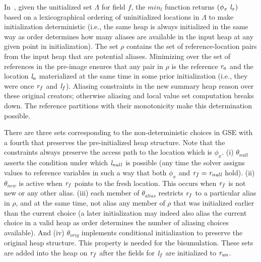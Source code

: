 
In~, given the unitialized set $\Lambda$ for
field $f$, the $\mathit{min}_l$ function returns
$(\phi_x\ \cfgnt{l}_x)$ based on a lexicographical ordering of
uninitialized locations in $\Lambda$ to make initialization
deterministic (i.e., the same heap is always initialized in the same
way as order determines how many aliases are available in the input heap at any given point in initialization). 
The set $\rho$ contains the set of
reference-location pairs from the input heap that are potential
aliases. Minimizing over the set of references in the pre-image ensures
that any pair in $\rho$ is the reference $\emph{r}_a$ and the location $\emph{l}_a$ materialized at the same time in some prior initialization (i.e., they were once
$\emph{r}_f$ and $\emph{l}_f$). Aliasing constraints
in the new summary heap reason over these original creators; otherwise aliasing and local value set
computation breaks down.  The reference partitions with their
monotonicity make this determination possible.

There are three sets corresponding to the non-deterministic choices in
GSE with a fourth that preserves the pre-initialized heap structure.
Note that the constraints always preserve the access path to the location which is $\phi_x$.
(i) $\theta_\mathit{null}$ asserts the condition under which
$\emph{l}_\mathit{null}$ is possible (any time the solver assigns
values to reference variables in such a way that both $\phi_x$ and $\emph{r}_f =
\emph{r}_\mathit{null}$ hold). (ii)
$\theta_\mathit{new}$ is active when $\emph{r}_f$ points to the
fresh location. This occurs when $\emph{r}_f$ is not new or any other alias. (iii) each member of $\theta_\mathit{alias}$ restricts $\emph{r}_f$ to
a particular alias in $\rho$, and at the same time, not alias any member of $\rho$
that was initialized earlier than the current choice (a later
initialization may indeed also alias the current choice in a valid
heap as order determines the number of aliasing choices available). And (iv) $\theta_\mathit{orig}$  implements conditional initialization to preserve the
original heap structure. This property is needed for the bisumulation. 
These sets are added into the heap on $\emph{r}_f$ after the fields for $\emph{l}_f$ are initialized to $\emph{r}_\mathit{un}$.


